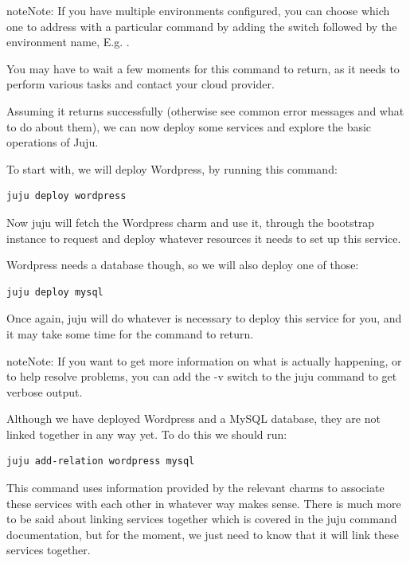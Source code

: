 \documentclass[letterpaper,10pt,english]{sphinxmanual}
\begin{document}
\begin{notice}{note}{Note:}
If you have multiple environments configured, you can choose
which one to address with a particular command by adding the 
switch followed by the environment name, E.g. .
\end{notice}

You may have to wait a few moments for this command to return, as it
needs to perform various tasks and contact your cloud provider.

Assuming it returns successfully (otherwise see common error messages
and what to do about them), we can now deploy some services and
explore the basic operations of Juju.

To start with, we will deploy Wordpress, by running this command:

\begin{Verbatim}[commandchars=\\\{\}]
juju deploy wordpress
\end{Verbatim}

Now juju will fetch the Wordpress charm and use it, through the
bootstrap instance to request and deploy whatever resources it needs
to set up this service.

Wordpress needs a database though, so we will also deploy one of
those:

\begin{Verbatim}[commandchars=\\\{\}]
juju deploy mysql
\end{Verbatim}

Once again, juju will do whatever is necessary to deploy this service
for you, and it may take some time for the command to return.

\begin{notice}{note}{Note:}
If you want to get more information on what is actually
happening, or to help resolve problems, you can add the -v switch to
the juju command to get verbose output.
\end{notice}

Although we have deployed Wordpress and a MySQL database, they are not
linked together in any way yet. To do this we should run:

\begin{Verbatim}[commandchars=\\\{\}]
juju add-relation wordpress mysql
\end{Verbatim}

This command uses information provided by the relevant charms to
associate these services with each other in whatever way makes sense.
There is much more to be said about linking services together which is
covered in the juju command documentation, but for the moment, we just
need to know that it will link these services together.
\end{document}
